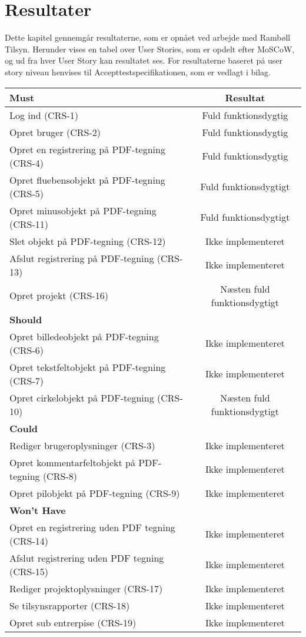 \chapter{Resultater}
Dette kapitel gennemgår resultaterne, som er opnået ved arbejde med Rambøll Tilsyn. Herunder vises en tabel over User Stories, som er opdelt efter MoSCoW, og ud fra hver User Story kan resultatet ses.
For resultaterne baseret på user story niveau henvises til Accepttestspecifikationen, som er vedlagt i bilag. \\
\begin{tabular}{ l | c  }
	\hline
	\textbf{Must} & \textbf{Resultat} \\ \hline
	Log ind (CRS-1) & Fuld funktionsdygtig \\
	\hline
	Opret bruger (CRS-2) & Fuld funktionsdygtig \\
	\hline
	Opret en registrering på PDF-tegning (CRS-4) & Fuld funktionsdygtig\\
	\hline
	Opret fluebensobjekt på PDF-tegning (CRS-5) & Fuld funktionsdygtigt\\
	\hline
	Opret minusobjekt på PDF-tegning (CRS-11) & Fuld funktionsdygtigt\\
	\hline
	Slet objekt på PDF-tegning (CRS-12) & Ikke implementeret\\
	\hline
	Afslut registrering på PDF-tegning (CRS-13) & Ikke implementeret\\
	\hline
	Opret projekt (CRS-16) & Næsten fuld funktionsdygtigt\\
	\hline
	\hline
	\textbf{Should} &  \\ \hline
	Opret billedeobjekt på PDF-tegning (CRS-6) & Ikke implementeret\\
	\hline
	Opret tekstfeltobjekt på PDF-tegning (CRS-7) & Ikke implementeret\\
	\hline
	Opret cirkelobjekt på PDF-tegning (CRS-10) & Næsten fuld funktionsdygtigt\\
	\hline
	\hline
	\textbf{Could} &  \\ \hline
	Rediger brugeroplysninger (CRS-3) & Ikke implementeret\\
	\hline
	Opret kommentarfeltobjekt på PDF-tegning (CRS-8)  & Ikke implementeret\\
	\hline
	Opret pilobjekt på PDF-tegning (CRS-9) & Ikke implementeret\\
	\hline
	\hline
	\textbf{Won't Have} & \\ \hline
	Opret en registrering uden PDF tegning (CRS-14) & Ikke implementeret\\
	\hline
	Afslut registrering uden PDF tegning (CRS-15) & Ikke implementeret\\
	\hline
	Rediger projektoplysninger (CRS-17) & Ikke implementeret\\
	\hline
	Se tilsynsrapporter (CRS-18) & Ikke implementeret\\
	\hline
	Opret sub entrerpise (CRS-19) & Ikke implementeret\\
	\hline
\end{tabular} \\


